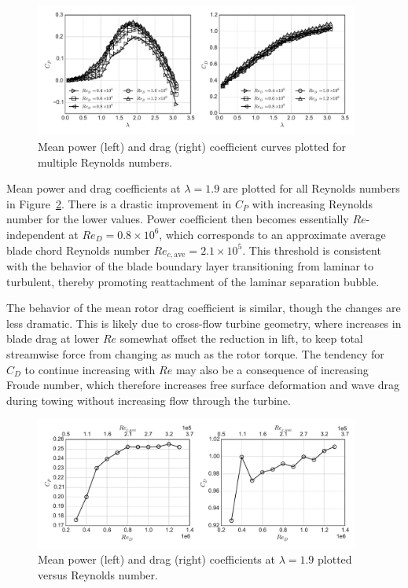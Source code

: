 \documentclass[energies,article,accept,moreauthors,pdftex,12pt,a4paper]{mdpi}
\begin{document}
\begin{figure}[ht]
\includegraphics[width=0.95\textwidth]{figures/perf_curves}
\caption{Mean power (left) and drag (right) coefficient curves plotted for
multiple Reynolds numbers.}
\label{fig:perf-curves}
\end{figure}

Mean power and drag coefficients at $\lambda=1.9$ are plotted for all Reynolds
numbers in Figure~\ref{fig:perf-Re-dep}. There is a drastic improvement in $C_P$
with increasing Reynolds number for the lower values. Power coefficient then
becomes  essentially $Re$-independent at $Re_D = 0.8 \times 10^6$, which
corresponds to an approximate average blade chord Reynolds number $Re_{c,
\mathrm{ave}} = 2.1 \times 10^5$. This threshold is consistent with the behavior
of the blade boundary layer transitioning from laminar to turbulent, thereby
promoting reattachment of the laminar separation bubble.

The behavior of the mean rotor drag coefficient is similar, though the changes
are less dramatic. This is likely due to cross-flow turbine geometry, where
increases in blade drag at lower $Re$ somewhat offset the reduction in lift, to
keep total streamwise force from changing as much as the rotor torque. The
tendency for $C_D$ to continue increasing with $Re$ may also be a consequence of
increasing Froude number, which therefore increases free surface deformation and
wave drag during towing without increasing flow through the turbine.

\begin{figure}[ht]
\includegraphics[width=0.95\textwidth]{figures/perf_re_dep}
\caption{Mean power (left) and drag (right) coefficients at $\lambda=1.9$
plotted versus Reynolds number.} 
\label{fig:perf-Re-dep}
\end{figure}
\end{document}
